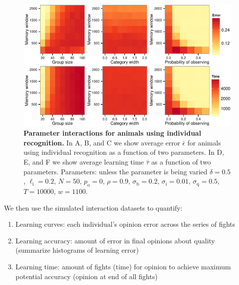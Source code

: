 \begin{figure}[h]
\includegraphics[width=.8\textwidth]{figures/parameter_interactions_indiv.pdf}
\caption{\sffamily\small\textbf{Parameter interactions for animals using individual recognition.}
In A, B, and C we show average error $\bar{\epsilon}$ for animals using individual recognition as a function of two parameters. In D, E, and F we show average learning time $\bar{\tau}$ as a function of two parameters. Parameters: unless the parameter is being varied $\delta = 0.5$, $\ell_\text{i}=0.2$, $N=50$, $p_\text{o}=0$, $\rho=0.9$, $\sigma_\text{b}=0.2$, $\sigma_\text{i}=0.01$, $\sigma_\text{q}=0.5$, $T=10000$, $w=1100$.}
\label{interactions_indiv}
\end{figure}



We then use the simulated interaction datasets to quantify: 
\begin{enumerate}
  \item Learning curves: each individual's opinion error across the series of fights 
  \item Learning accuracy: amount of error in final opinions about quality (summarize histograms of learning error)
  \item Learning time: amount of fights (time) for opinion to achieve maximum potential accuracy (opinion at end of all fights)  
\end{enumerate}